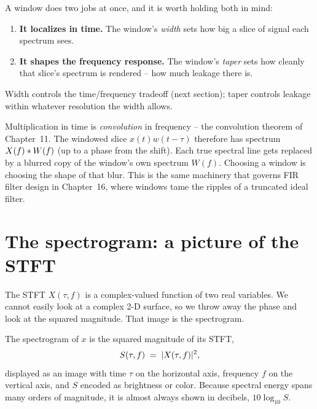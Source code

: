 \begin{focusbox}
A window does two jobs at once, and it is worth holding both in mind:
\begin{enumerate}
  \item \textbf{It localizes in time.} The window's \emph{width} sets how big a
        slice of signal each spectrum sees.
  \item \textbf{It shapes the frequency response.} The window's \emph{taper} sets
        how cleanly that slice's spectrum is rendered -- how much leakage there is.
\end{enumerate}
Width controls the time/frequency tradeoff (next section); taper controls leakage
within whatever resolution the width allows.
\end{focusbox}

\begin{connectionbox}
Multiplication in time is \emph{convolution} in frequency -- the convolution
theorem of Chapter~11. The windowed slice $x(t)w(t-\tau)$ therefore has spectrum
$X(f) \ast W(f)$ (up to a phase from the shift). Each true spectral line gets
replaced by a blurred copy of the window's own spectrum $W(f)$. Choosing a window
is choosing the shape of that blur. This is the same machinery that governs FIR
filter design in Chapter~16, where windows tame the ripples of a truncated ideal
filter.
\end{connectionbox}

\section{The spectrogram: a picture of the STFT}
\label{ch10:spectrogram}

The STFT $X(\tau, f)$ is a complex-valued function of two real variables. We
cannot easily look at a complex 2-D surface, so we throw away the phase and look
at the squared magnitude. That image is the spectrogram.

\begin{definition}[Spectrogram]
\label{ch10:specgram-defn}
The spectrogram of $x$ is the squared magnitude of its STFT,
\begin{equation}
\label{ch10:specgram-eqn}
S(\tau, f) \;=\; \lvert X(\tau, f)\rvert^2,
\end{equation}
displayed as an image with time $\tau$ on the horizontal axis, frequency $f$ on
the vertical axis, and $S$ encoded as brightness or color. Because spectral
energy spans many orders of magnitude, it is almost always shown in decibels,
$10\log_{10} S$.
\end{definition}

